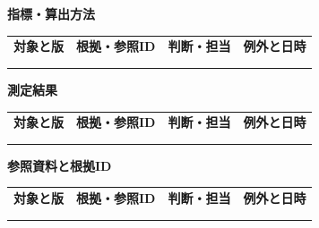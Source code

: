 \documentclass[11pt,a4paper]{article}
\begin{document}
\par{}\noindent\textbf{指標・算出方法}\par\vspace{1mm}
{\fontsize{8.5}{13}\selectfont
\begin{tabularx}{\linewidth}{@{}XXXX@{}}
\textbf{対象と版} & \textbf{根拠・参照ID} & \textbf{判断・担当} & \textbf{例外と日時}\\[2mm]
\strut & \strut & \strut & \strut\\[5mm]
\strut & \strut & \strut & \strut\\[5mm]
\end{tabularx}
}\vspace{2mm}\par
{}
\par{}\noindent\textbf{測定結果}\par\vspace{1mm}
{\fontsize{8.5}{13}\selectfont
\begin{tabularx}{\linewidth}{@{}XXXX@{}}
\textbf{対象と版} & \textbf{根拠・参照ID} & \textbf{判断・担当} & \textbf{例外と日時}\\[2mm]
\strut & \strut & \strut & \strut\\[5mm]
\strut & \strut & \strut & \strut\\[5mm]
\end{tabularx}
}\vspace{2mm}\par
{}
\par{}\noindent\textbf{参照資料と根拠ID}\par\vspace{1mm}
{\fontsize{8.5}{13}\selectfont
\begin{tabularx}{\linewidth}{@{}XXXX@{}}
\textbf{対象と版} & \textbf{根拠・参照ID} & \textbf{判断・担当} & \textbf{例外と日時}\\[2mm]
\strut & \strut & \strut & \strut\\[5mm]
\strut & \strut & \strut & \strut\\[5mm]
\end{tabularx}
}\vspace{2mm}\par
\end{document}
